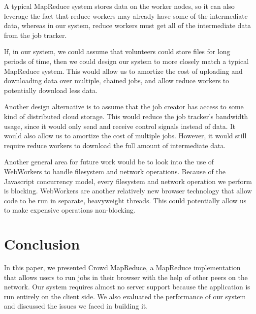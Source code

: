 \documentclass{article} %
\begin{document}
A typical MapReduce system stores data on the worker nodes, so it can also
leverage the fact that reduce workers may already have some of the intermediate
data, whereas in our system, reduce workers must get all of the intermediate
data from the job tracker.

If, in our system, we could assume that volunteers could store files for long
periods of time, then we could design our system to more closely match a typical
MapReduce system. This would allow us to amortize the cost of uploading and
downloading data over multiple, chained jobs, and allow reduce workers to
potentially download less data.

Another design alternative is to assume that the job creator has access to some
kind of distributed cloud storage. This would reduce the job tracker's
bandwidth usage, since it would only send and receive control signals instead
of data. It would also allow us to amortize the cost of multiple jobs. However,
it would still require reduce workers to download the full amount of
intermediate data.

Another general area for future work would be to look into the use of WebWorkers
to handle filesystem and network operations. Because of the Javascript
concurrency model, every filesystem and network operation we perform is
blocking. WebWorkers are another relatively new browser technology that allow
code to be run in separate, heavyweight threads. This could potentially allow us
to make expensive operations non-blocking.

\section{Conclusion}
In this paper, we presented Crowd MapReduce, a MapReduce implementation that
allows users to run jobs in their browser with the help of other peers on the
network. Our system requires almost no server support because the application is
run entirely on the client side. We also evaluated the performance of our system and
discussed the issues we faced in building it.



\end{document}
